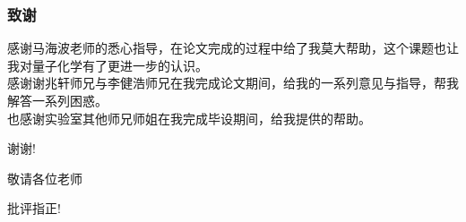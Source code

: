 \documentclass[10pt,aspectratio=43,mathserif,UTF8]{beamer}
\begin{document}
\begin{frame}
	\frametitle{致谢}
	感谢马海波老师的悉心指导，在论文完成的过程中给了我莫大帮助，这个课题也让我对量子化学有了更进一步的认识。\\
	感谢谢兆轩师兄与李健浩师兄在我完成论文期间，给我的一系列意见与指导，帮我解答一系列困惑。\\
	也感谢实验室其他师兄师姐在我完成毕设期间，给我提供的帮助。
\end{frame}


\begin{frame}
	\Huge{\centerline{谢谢!}}
	\Huge{\centerline{敬请各位老师}}
	\Huge{\centerline{批评指正!}}
\end{frame}

\end{document}
